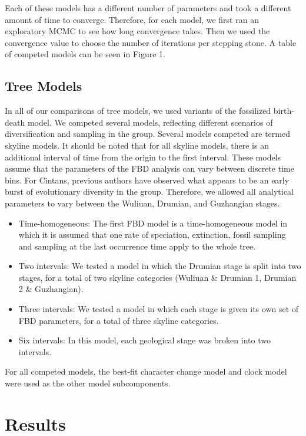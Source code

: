 \documentclass{article}
\begin{document}
Each of these models has a different number of parameters and took a different amount of time to converge. Therefore, for each model, we first ran an exploratory MCMC to see how long convergence takes. Then we used the convergence value to choose the number of iterations per stepping stone.
A table of competed models can be seen in Figure 1.

\subsection{Tree Models}

In all of our comparisons of tree models, we used variants of the fossilized birth-death model. 
We competed several models, reflecting different scenarios of diversification and sampling in the group.
Several models competed are termed skyline models.
It should be noted that for all skyline models, there is an additional interval of time from the origin to the first interval.
These models assume that the parameters of the FBD analysis can vary between discrete time bins.
For Cintans, previous authors have observed what appears to be an early burst of evolutionary diversity in the group.
Therefore, we allowed all analytical parameters to vary between the Wuliuan, Drumian, and Guzhangian stages.

\begin{itemize}
\item Time-homogeneous: The first FBD model is a time-homogeneous model in which it is assumed that one rate of speciation, extinction, fossil sampling and sampling at the last occurrence time apply to the whole tree. 
\item Two intervals: We tested a model in which the Drumian stage is split into two stages, for a total of two skyline categories (Wuliuan \& Drumian 1, Drumian 2 \& Guzhangian).
\item Three intervals: We tested a model in which each stage is given its own set of FBD parameters, for a total of three skyline categories.
\item Six intervals: In this model, each geological stage was broken into two intervals.
\end{itemize}
For all competed models, the best-fit character change model and clock model were used as the other model subcomponents.

\section{Results}
\end{document}
